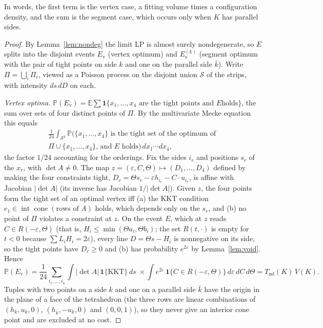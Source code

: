 \documentclass[11pt]{amsart}
\theoremstyle{remark}\newtheorem{remark}[theorem]{Remark}
\newcommand{\Prob}{\mathbb{P}}
\newcommand{\E}{\mathbb{E}}
\begin{document}
In words, the first term is the vertex case, a fitting volume times a configuration density, and the sum is the segment case, which occurs only when $K$ has parallel sides.

\begin{proof}
By Lemma~\ref{lem:nondeg} the limit LP is almost surely nondegenerate, so $E$ splits into the disjoint events
$E_{\mathrm v}$ (vertex optimum) and $E_{\mathrm s}^{(k)}$ (segment optimum with the pair of tight points on side $k$
and one on the parallel side $\bar k$). Write $\Pi=\bigcup_i\Pi_i$, viewed as a Poisson process on the disjoint union
$\mathcal S$ of the strips, with intensity $ds\,dD$ on each.

\emph{Vertex optima.} $\Prob(E_{\mathrm v})=\E\sum\mathbf 1\{x_1,\dots,x_4\text{ are the tight points and }E\text{
holds}\}$, the sum over sets of four distinct points of $\Pi$. By the multivariate Mecke equation
\cite[Thm.~4.4]{lp} this equals
\begin{multline*}
\frac1{24}\int_{\mathcal S^4}\Prob\big(\{x_1,\dots,x_4\}\text{ is the tight set of the optimum of }\\
\Pi\cup\{x_1,\dots,x_4\}\text{, and }E\text{ holds}\big)\,dx_1\cdots dx_4 ,
\end{multline*}
the factor $1/24$ accounting for the orderings. Fix the sides $i_r$ and positions $s_r$ of the $x_r$, with $\det
A\ne0$. The map $z=(\varepsilon,C,\Theta)\mapsto(D_1,\dots,D_4)$ defined by making the four constraints tight,
$D_r=\Theta s_r-\varepsilon h_{i_r}-C\cdot u_{i_r}$, is affine with Jacobian $|\det A|$ (its inverse has Jacobian
$1/|\det A|$). Given $z$, the four points
form the tight set of an optimal vertex iff (a) the KKT condition $e_1\in\operatorname{int}\operatorname{cone}(\text{rows
of }A)$ holds, which depends only on the $s_r$, and (b) no point of $\Pi$ violates a constraint at $z$. On the event
$E$, which at $z$ reads $C\in R(-\varepsilon,\Theta)$ (that is, $H_i\le\min(\Theta a_i,\Theta b_i)$; the set
$R(t,\cdot)$ is empty for $t<0$ because $\sum L_iH_i=2\varepsilon$), every line $D=\Theta s-H_i$ is nonnegative on its
side, so the tight points have $D_r\ge0$ and (b) has probability $e^{2\varepsilon}$ by Lemma~\ref{lem:void}. Hence
\[
\Prob(E_{\mathrm v})=\frac1{24}\sum_{i_1,\dots,i_4}\int|\det A|\,\mathbf 1\{\text{KKT}\}\,ds\;\times\int
e^{2\varepsilon}\,\mathbf 1\{C\in R(-\varepsilon,\Theta)\}\,d\varepsilon\,dC\,d\Theta=T_{\mathrm{nd}}(K)\,V(K).
\]
Tuples with two points on a side $k$ and one on a parallel side $\bar k$ have the origin in the plane of a face of the tetrahedron
(the three rows are linear combinations of $(h_k,u_k,0)$, $(h_{\bar k},-u_k,0)$ and $(0,0,1)$), so they never give an
interior cone point and are excluded at no cost.


\end{proof}
\end{document}
